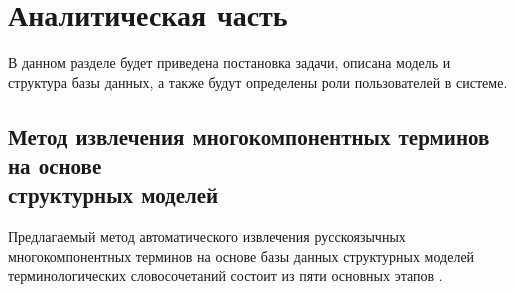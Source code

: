 \section{Аналитическая часть}

В данном разделе будет приведена постановка задачи, описана модель и структура базы данных, а также будут определены роли пользователей в системе.

\subsection{Метод извлечения многокомпонентных терминов на основе \\структурных моделей}

Предлагаемый метод автоматического извлечения русскоязычных многокомпонентных терминов на основе базы данных структурных моделей терминологических словосочетаний состоит из пяти основных этапов \cite{My_article_2021}.

